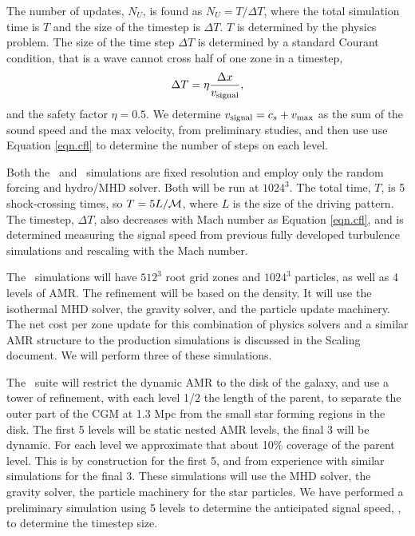 The number of updates, $N_U$, is found as
$N_U=T/\Delta T$, where the total simulation time is $T$ and the size of the
timestep is $\Delta T$.  $T$ is determined by the physics
problem.  The size of the time step $\Delta T$ is
determined by a standard Courant condition, that is a wave cannot cross half of
one zone in a timestep, 
\begin{align}
\Delta T = \eta \frac{\Delta
x}{v_{\rm{signal}}}, \label{eqn.cfl}
\end{align}
and the safety factor $\eta = 0.5$.  We determine $v_{\rm{signal}}=c_s+v_{\rm{max}}$
 as the sum of the sound speed and the max velocity, from preliminary studies, and then use use Equation \ref{eqn.cfl} to
determine the number of steps on each level.

Both the \nameTurbulence\ and \nameCMB\ simulations are fixed resolution and
employ only the random forcing and hydro/MHD solver.    Both will be
run at $1024^3$.  The total time, $T$, is 5 shock-crossing times, so $T =
5 L/\mathcal{M}$, where $L$ is the size of the driving pattern.  The
timestep, $\Delta T$, also decreases with Mach number as Equation \ref{eqn.cfl},
and is determined measuring the signal speed \vsignal from
previous fully developed turbulence simulations and rescaling with the Mach
number.

The \nameCores\ simulations will have $512^3$ root grid zones and $1024^3$
particles, as well as 4 levels of AMR.  The refinement will be based on the
density.  It will use the isothermal MHD solver, the gravity solver, and the
particle update machinery.  The net cost per zone update for this combination of
physics solvers and a similar AMR structure to the production simulations is
discussed in the Scaling document.  We will perform three of these simulations.

The \nameGalaxies\ suite will restrict the dynamic AMR to the disk of the galaxy, and
use a tower of refinement, with each level 1/2 the length of the parent, to separate the outer
part of the CGM at 1.3 Mpc from the small star forming regions in the disk.  The
first 5 levels will be static nested AMR levels, the final 3 will be dynamic.
For each level we approximate that about 10\% coverage of the parent level.
This is by construction for the first 5, and from experience with similar
simulations for the final 3.  These simulations will use the MHD solver, the
gravity solver, the particle machinery for the star particles.  We have performed a preliminary
simulation using 5 levels to determine the 
anticipated signal speed, \vsignal, to determine the timestep size. 

